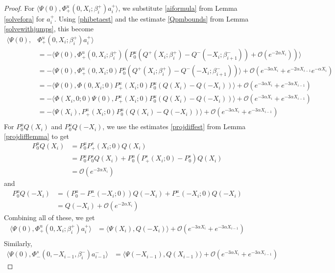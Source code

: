 \documentclass[thesis.tex]{subfiles}
\begin{document}
\begin{lemma}
\begin{proof}
For $\langle \Psi(0), \Phi^u_+(0, X_i; \beta_i^+) a_i^+ \rangle$, we substitute \eqref{aiformula} from Lemma \ref{solvefora} for $a_i^+$. Using \eqref{phibetaest} and the estimate \eqref{Qpmbounds} from Lemma \ref{solvewithjumps}, this become
\begin{align*}
\langle \Psi(0), &\Phi^u_+(0, X_i; \beta_i^+) a_i^+ \rangle \\
&= -\langle \Psi(0), \Phi^u_+(0, X_i; \beta_i^+)\left( P^u_0 ( Q^+(X_i; \beta_i^+) - Q^-(-X_i; \beta_{i+1}^-)) + \mathcal{O}( e^{-2 \alpha X_i} ) \right) \rangle \\
&= -\langle \Psi(0), \Phi^u_+(0, X_i; 0) P^u_0 \left( Q^+(X_i; \beta_i^+) - Q^-(-X_i; \beta_{i+1}^-) \right) \rangle + \mathcal{O}( e^{-3 \alpha X_i} + e^{-2\alpha X_{i-1}}e^{-\alpha X_i} )\\
&= -\langle \Psi(0), \Phi(0, X_i; 0) P^u_+(X_i; 0) P^u_0 \left( Q(X_i) - Q(-X_i) \right) \rangle + \mathcal{O}( e^{-3 \alpha X_i} + e^{-3\alpha X_{i-1}})\\
&= -\langle \Phi(X_i, 0; 0) \Psi(0), P^u_+(X_i; 0) P^u_0 \left( Q(X_i) - Q(-X_i) \right) \rangle + \mathcal{O}( e^{-3 \alpha X_i} + e^{-3\alpha X_{i-1}})\\
&= -\langle \Psi(X_i), P^u_+(X_i; 0) P^u_0 \left( Q(X_i) - Q(-X_i) \right) \rangle + \mathcal{O}( e^{-3 \alpha X_i} + e^{-3\alpha X_{i-1}})\\
\end{align*}
For $P^u_0 Q(X_i)$ and $P^u_0 Q(-X_i)$, we use the estimates \eqref{projdiffest} from Lemma \ref{projdifflemma} to get
\begin{align*}
P^u_0 Q(X_i) &= P^u_0 P^s_+(X_i; 0) Q(X_i) \\
&= P^u_0 P^s_0 Q(X_i) + P^u_0 ( P^s_+(X_i; 0) - P^s_0) Q(X_i) \\
&= \mathcal{O}(e^{-2\alpha X_i})
\end{align*}
and
\begin{align*}
P^u_0 Q(-X_i) &= (P^u_0 - P^u_-(-X_i; 0)) Q(-X_i) + P^u_-(-X_i; 0) Q(-X_i) \\
&= Q(-X_i) + \mathcal{O}(e^{-2\alpha X_i})
\end{align*}
Combining all of these, we get
\begin{align*}
\langle \Psi(0), \Phi^u_+(0, X_i; \beta_i^+) a_i^+ \rangle 
&= \langle \Psi(X_i), Q(-X_i) \rangle + \mathcal{O}( e^{-3 \alpha X_i} + e^{-3\alpha X_{i-1}})\\
\end{align*}
Similarly,
\begin{align*}
\langle \Psi(0), \Phi^s_-(0, -X_{i-1}, \beta_i^-) a_{i-1}^- \rangle &= 
\langle \Psi(-X_{i-1}), Q(X_{i-1}) \rangle + \mathcal{O}( e^{-3 \alpha X_i} + e^{-3\alpha X_{i-1}})
\end{align*}


\end{proof}
\end{lemma}
\end{document}
